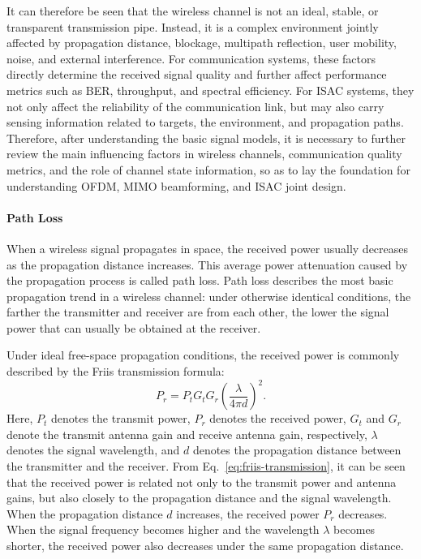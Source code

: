It can therefore be seen that the wireless channel is not an ideal,
stable,
or transparent transmission pipe.
Instead,
it is a complex environment jointly affected by propagation distance,
blockage,
multipath reflection,
user mobility,
noise,
and external interference.
For communication systems,
these factors directly determine the received signal quality
and further affect performance metrics such as BER,
throughput,
and spectral efficiency.
For ISAC systems,
they not only affect the reliability of the communication link,
but may also carry sensing information related to targets,
the environment,
and propagation paths.
Therefore,
after understanding the basic signal models,
it is necessary to further review the main influencing factors in wireless channels,
communication quality metrics,
and the role of channel state information,
so as to lay the foundation for understanding OFDM,
MIMO beamforming,
and ISAC joint design.
 
\paragraph{Path Loss}

When a wireless signal propagates in space,
the received power usually decreases as the propagation distance increases.
This average power attenuation caused by the propagation process is called path loss.
Path loss describes the most basic propagation trend in a wireless channel:
under otherwise identical conditions,
the farther the transmitter and receiver are from each other,
the lower the signal power that can usually be obtained at the receiver.

Under ideal free-space propagation conditions,
the received power is commonly described by the Friis transmission formula:
\begin{equation}
    P_r
    =
    P_t G_t G_r
    \left(
        \frac{\lambda}{4\pi d}
    \right)^2 .
    \label{eq:friis-transmission}
\end{equation}
Here,
\(P_t\) denotes the transmit power,
\(P_r\) denotes the received power,
\(G_t\) and \(G_r\) denote the transmit antenna gain and receive antenna gain,
respectively,
\(\lambda\) denotes the signal wavelength,
and \(d\) denotes the propagation distance between the transmitter and the receiver.
From Eq.~\eqref{eq:friis-transmission},
it can be seen that the received power is related not only to the transmit power and antenna gains,
but also closely to the propagation distance and the signal wavelength.
When the propagation distance \(d\) increases,
the received power \(P_r\) decreases.
When the signal frequency becomes higher and the wavelength \(\lambda\) becomes shorter,
the received power also decreases under the same propagation distance.

